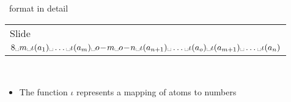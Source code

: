 \begin{frame}[c]{\smodels\ format in detail}
\begin{tabular}{|l|}
      Slide~\pageref{eqn:rule:disjunctive}
      \\
      \(
      8\myspace
      m\myspace
      \iota(a_1)\myspace\dots\myspace\iota(a_{m})\myspace
      o\!-\!m\myspace
      o\!-\!n\myspace
      \iota(a_{n+1})\myspace\dots\myspace\iota(a_{o})\myspace
      \iota(a_{m+1})\myspace\dots\myspace\iota(a_{n})
      \)
      \\
      \hline
    \end{tabular}
    \\
    \medskip
    \normalsize
    \begin{itemize}
    \item<1-> The function $\iota$ represents a mapping of atoms to numbers
    \end{itemize}
\end{frame}
